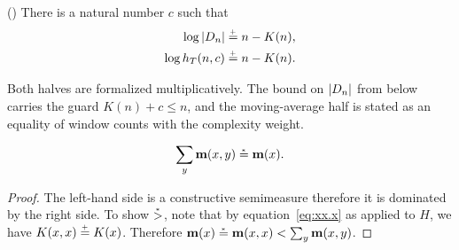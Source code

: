 \begin{theorem}
  \leanok
   \label{thm:exactstat} (\cite{SolovayManu}) 
 There is a natural number $c$ such that 
 \begin{align}
	\log|D_{n}|	&\stackrel{{}_+}{=} n-K(n),	\label{eq:Dn}
  \\	\log h_{T}(n,c)	&\stackrel{{}_+}{=} n-K(n).	\label{eq:aver}
 \end{align}
 \end{theorem}

\begin{formalization}
Both halves are formalized multiplicatively. The bound on $|D_n|$ from below carries the guard $K(n) + c \le n$, and the moving-average half is stated as an equality of window counts with the complexity weight.
\end{formalization}

\begin{lemma}
  \leanok
   \label{l:projmeas} 
 \[
 	\sum_y \mathbf{m}(x,y) \stackrel{{}_*}{=} \mathbf{m}(x).
 \]
 \end{lemma}

\begin{proof}
  \leanok
  The left-hand side is a constructive semimeasure therefore it is
dominated by the right side.
  To show $\stackrel{{}_*}{>}$, note that by equation~\eqref{eq:xx.x} as applied to $H$, we
have $K(x,x) \stackrel{{}_+}{=} K(x)$.
  Therefore $\mathbf{m}(x) \stackrel{{}_*}{=} \mathbf{m}(x,x) < \sum_y \mathbf{m}(x,y)$.
 \end{proof}

